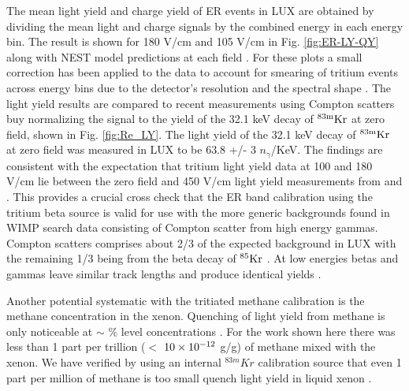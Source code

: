 The mean light yield and charge yield of ER events in LUX are obtained by dividing the mean light and charge signals by the combined energy in each energy bin. The result is shown for 180 V/cm and 105 V/cm in Fig. \ref{fig:ER-LY-QY} along with NEST model predictions at each field \cite{NEST_2013}. For these plots a small correction has been applied to the data to account for smearing of tritium events across energy bins due to the detector's resolution and the spectral shape \cite{Dobi_Thesis}. 
The light yield results are compared to recent measurements using Compton scatters buy normalizing the signal to the yield of the 32.1 keV decay of $\rm ^{83m}Kr$ at zero field, shown in Fig. \ref{fig:Re_LY}. The light yield of the 32.1 keV decay of $\rm ^{83m}Kr$ at zero field was measured in LUX to be 63.8 +/- 3 $n_\gamma$/KeV.  The findings are consistent with the expectation that tritium light yield data at 100 and 180 V/cm lie between the zero field and 450 V/cm light yield measurements from \cite{Aprile_LY} and \cite{Baudis}. This provides a crucial cross check that the ER band calibration using the tritium beta source is valid for use with the more generic backgrounds found in WIMP search data consisting of Compton scatter from high energy gammas. Compton scatters comprises about 2/3 of the expected background in LUX with the remaining 1/3 being from the beta decay of $\rm ^{85}Kr$ \cite{LUX_BG}. At low energies betas and gammas leave similar track lengths and produce identical yields \cite{NEST} \cite{NEST_2013}. 

Another potential systematic with the tritiated methane calibration is the methane concentration in the xenon. Quenching of light yield from methane is only noticeable at $\sim$ \% level concentrations \cite{Kirill_Methane}. For the work shown here there was less than 1 part per trillion ($<$ $\rm10\times10^{-12}$ g/g) of methane mixed with the xenon. We have verified by using an internal $^{83m}Kr$ calibration source that even 1 part per million of methane is too small quench light yield in liquid xenon \cite{Dobi_Thesis}.


